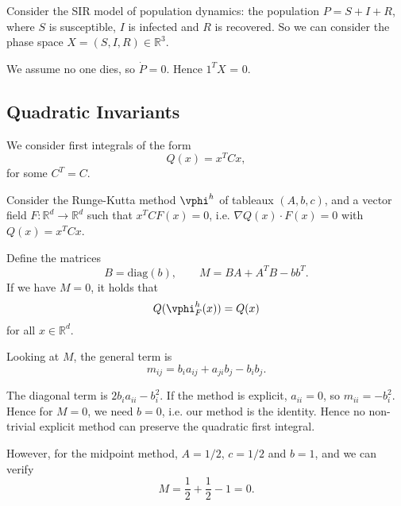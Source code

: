 \documentclass[12pt]{article}
\begin{document}
\begin{exbox}
	Consider the SIR model of population dynamics: the population $P = S + I + R$, where $S$ is susceptible, $I$ is infected and $R$ is recovered. So we can consider the phase space $X = (S, I, R) \in \mathbb{R}^3$.

	We assume no one dies, so $\dot P = 0$. Hence $1^{T} X$ = 0.
\end{exbox}

\subsection{Quadratic Invariants}%
\label{sub:qi}

We consider first integrals of the form
\[
Q(x) = x^{T} C x,
\]
for some $C^{T} = C$.

\begin{theorem}
	Consider the Runge-Kutta method $\vphi^{h}$ of tableaux $(A, b, c)$, and a vector field $F : \mathbb{R}^{d} \to \mathbb{R}^{d}$ such that $x^{T} C F(x) = 0$, i.e. $\nabla Q(x) \cdot F(x) = 0$ with $Q(x) = x^{T} C x$.

	Define the matrices
	\[
	B = \mathrm{diag}(b), \qquad M = BA + A^{T}B - b b^{T}.
	\]
	If we have $M = 0$, it holds that
	\[
	Q(\vphi_F^{h}(x)) = Q(x)
	\]
	for all $x \in \mathbb{R}^{d}$.
\end{theorem}

Looking at $M$, the general term is
\[
m_{ij} = b_i a_{ij} + a_{ji} b_j - b_i b_j.
\]

\begin{exbox}
	The diagonal term is $2b_i a_{ii} - b_i^2$. If the method is explicit, $a_{ii} = 0$, so $m_{ii} = -b_i^2$. Hence for $M = 0$, we need $b = 0$, i.e. our method is the identity. Hence no non-trivial explicit method can preserve the quadratic first integral.

	However, for the midpoint method, $A = 1/2$, $c = 1/2$ and $b = 1$, and we can verify
	\[
	M = \frac 12 + \frac 12 - 1 = 0.
	\]
\end{exbox}
\end{document}
